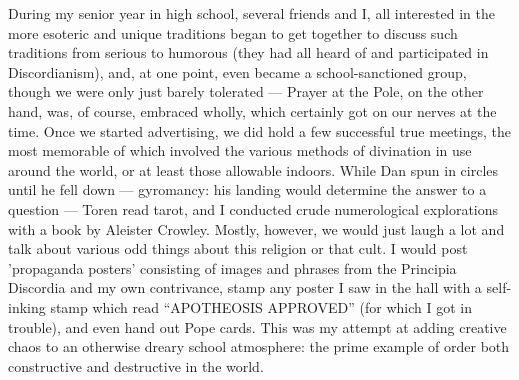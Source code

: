 During my senior year in high school, several friends and I, all interested in the more esoteric and unique traditions began to get together to discuss such traditions from serious to humorous (they had all heard of and participated in Discordianism), and, at one point, even became a school-sanctioned group, though we were only just barely tolerated --- Prayer at the Pole, on the other hand, was, of course, embraced wholly, which certainly got on our nerves at the time. Once we started advertising, we did hold a few successful true meetings, the most memorable of which involved the various methods of divination in use around the world, or at least those allowable indoors. While Dan spun in circles until he fell down --- gyromancy: his landing would determine the answer to a question --- Toren read tarot, and I conducted crude numerological explorations with a book by Aleister Crowley. Mostly, however, we would just laugh a lot and talk about various odd things about this religion or that cult. I would post 'propaganda posters' consisting of images and phrases from the Principia Discordia and my own contrivance, stamp any poster I saw in the hall with a self-inking stamp which read ``APOTHEOSIS APPROVED'' (for which I got in trouble), and even hand out Pope cards. This was my attempt at adding creative chaos to an otherwise dreary school atmosphere: the prime example of order both constructive and destructive in the world.
